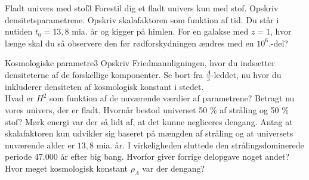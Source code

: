 \begin{opgave}{Fladt univers med stof}{3}
	Forestil dig et fladt univers kun med stof.
	\opg Opskriv densitetsparametrene.
	\opg Opskriv skalafaktoren som funktion af tid.
	\opg Du står i nutiden $t_0 = 13,8$ mia. år og kigger på himlen. For en galakse med $z=1$, hvor længe skal du så observere den før rødforskydningen ændres med en $10^6$.-del? %
\end{opgave}

\begin{opgave}{Kosmologiske parametre}{3}
	\opg Opskriv Friedmannligningen, hvor du indsætter densiteterne af de forskellige komponenter. Se bort fra $\frac{\Lambda}{3}$-leddet, nu hvor du inkluderer densiteten af kosmologisk konstant i stedet.\\
	Hvad er $H^2$ som funktion af de nuværende værdier af parametrene?
	\opg Betragt nu vores univers, der er fladt. Hvornår bestod universet 50 \% af stråling og 50 \% stof? Mørk energi var der så lidt af, at det kunne negliceres dengang. Antag at skalafaktoren kun udvikler sig baseret på mængden af stråling og at universets nuværende alder er $13,8$ mia. år.
	\opg I virkeligheden sluttede den strålingsdominerede periode 47.000 år efter big bang. Hvorfor giver forrige delopgave noget andet?
	\opg Hvor meget kosmologisk konstant $\rho_\Lambda$ var der dengang? %
\end{opgave}
